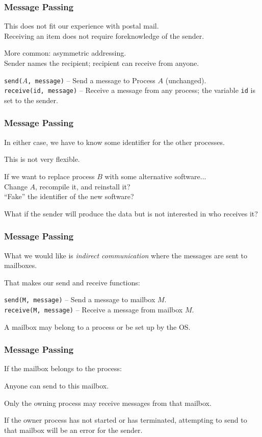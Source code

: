 \begin{frame}
\frametitle{Message Passing}

This does not fit our experience with postal mail.\\
\quad Receiving an item does not require foreknowledge of the sender.

More common: asymmetric addressing.\\
\quad Sender names the recipient; recipient can receive from anyone.

\texttt{send($A$, message)} -- Send a message to Process $A$ (unchanged).\\
\texttt{receive(id, message)} -- Receive a message from any process; the variable \texttt{id} is set to the sender.

\end{frame}

\begin{frame}
\frametitle{Message Passing}

In either case, we have to know some identifier for the other processes. 

This is not very flexible.

If we want to replace process $B$ with some alternative software...\\
\quad Change $A$, recompile it, and reinstall it?\\
\quad ``Fake'' the identifier of the new software? 

What if the sender will produce the data but is not interested in who receives it?

\end{frame}

\begin{frame}
\frametitle{Message Passing}

What we would like is \textit{indirect communication} where the messages are sent to mailboxes. 

That makes our send and receive functions:

\texttt{send(M, message)} -- Send a message to mailbox $M$.\\
\texttt{receive(M, message)} -- Receive a message from mailbox $M$.

A mailbox may belong to a process or be set up by the OS.

\end{frame}

\begin{frame}
\frametitle{Message Passing}
If the mailbox belongs to the process: 

Anyone can send to this mailbox. 

Only the owning process may receive messages from that mailbox. 

If the owner process has not started or has terminated, attempting to send to that mailbox will be an error for the sender.

\end{frame}


